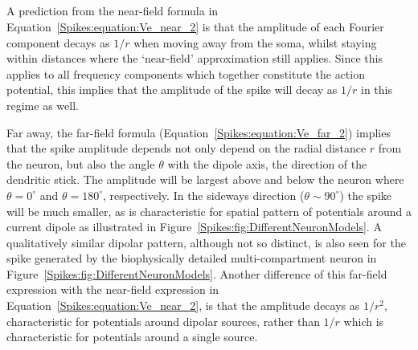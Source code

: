 
\subsection{}
A prediction from the near-field formula in Equation~\ref{Spikes:equation:Ve_near_2} is that the amplitude of each Fourier component decays as $1/r$ when moving away from the soma, whilst staying within distances where the `near-field' approximation still applies.
Since this applies to all frequency components which together constitute the action potential, this implies that the amplitude of the 
spike will decay as $1/r$ in this regime as well. 

Far away, the far-field formula (Equation~\ref{Spikes:equation:Ve_far_2}) implies that the spike amplitude depends not only depend on the radial distance $r$ from the neuron, but also the angle $\theta$ with the dipole axis, the direction of the dendritic stick. The amplitude will be largest above and below the neuron where $\theta=0^\circ$ and $\theta=180^\circ$, respectively. In the sideways direction 
($\theta \sim 90^\circ$) the spike will be much smaller, as is characteristic for spatial pattern of potentials around a current
dipole as illustrated in Figure~\ref{Spikes:fig:DifferentNeuronModels}. A qualitatively similar dipolar pattern, although not so distinct,
is also seen for the spike generated by the biophysically detailed multi-compartment neuron in 
Figure~\ref{Spikes:fig:DifferentNeuronModels}.
Another difference of this far-field expression with the near-field expression in Equation~\ref{Spikes:equation:Ve_near_2}, is that the
amplitude decays as $1/r^2$, characteristic for potentials around dipolar sources, rather than $1/r$ which is characteristic for potentials around 
a single source. %

